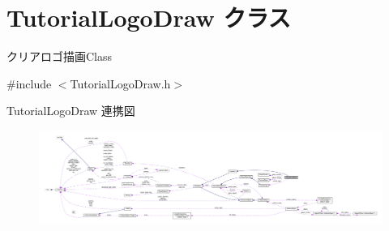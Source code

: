 \hypertarget{class_tutorial_logo_draw}{}\section{Tutorial\+Logo\+Draw クラス}
\label{class_tutorial_logo_draw}


クリアロゴ描画\+Class  




{\ttfamily \#include $<$Tutorial\+Logo\+Draw.\+h$>$}



Tutorial\+Logo\+Draw 連携図\nopagebreak
\begin{figure}[H]
\begin{center}
\leavevmode
\includegraphics[width=350pt]{class_tutorial_logo_draw__coll__graph}
\end{center}
\end{figure}
